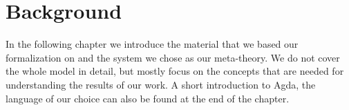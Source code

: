 \chapter{Background}
\label{chp:background}

In the following chapter we introduce the material that we based our formalization on and the system we chose as our meta-theory. We do not cover the whole model in detail, but mostly focus on the concepts that are needed for understanding the results of our work. A short introduction to Agda, the language of our choice can also be found at the end of the chapter.



